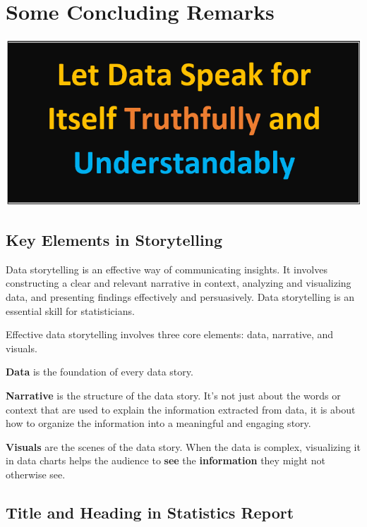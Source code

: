 \documentclass[
]{book}
\begin{document}
\hypertarget{some-concluding-remarks}{%
\section{Some Concluding Remarks}\label{some-concluding-remarks}}

\begin{center}\includegraphics[width=0.8\linewidth]{img05/w05-LetDataSpeak} \end{center}

\hypertarget{key-elements-in-storytelling}{%
\subsection{Key Elements in Storytelling}\label{key-elements-in-storytelling}}

Data storytelling is an effective way of communicating insights. It involves constructing a clear and relevant narrative in context, analyzing and visualizing data, and presenting findings effectively and persuasively. Data storytelling is an essential skill for statisticians.

Effective data storytelling involves three core elements: data, narrative, and visuals.

\textbf{Data} is the foundation of every data story.

\textbf{Narrative} is the structure of the data story. It's not just about the words or context that are used to explain the information extracted from data, it is about how to organize the information into a meaningful and engaging story.

\textbf{Visuals} are the scenes of the data story. When the data is complex, visualizing it in data charts helps the audience to \textbf{see} the \textbf{information} they might not otherwise see.

\hypertarget{title-and-heading-in-statistics-report}{%
\subsection{Title and Heading in Statistics Report}\label{title-and-heading-in-statistics-report}}
\end{document}
